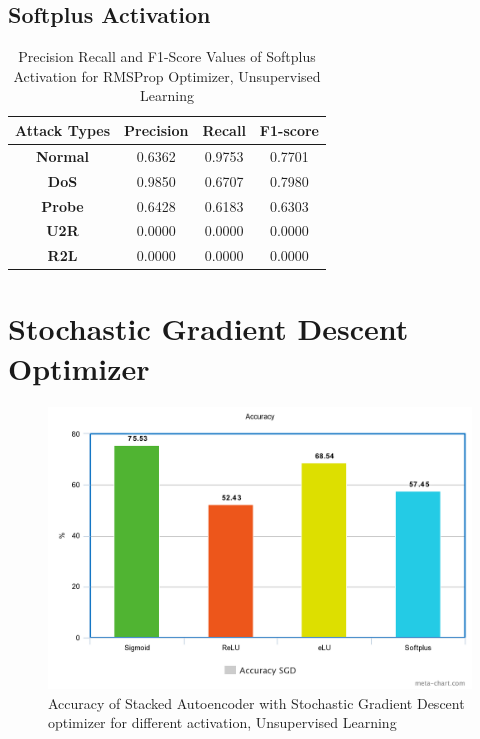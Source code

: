 \documentclass[12pt, a4paper]{report}
\begin{document}
\begin{appendices}
   \subsection{Softplus Activation}
  \begin{table}[h]
		\centering
		\captionsetup{justification=centering,margin=2cm}
		\begin{tabular}{|c|c|c|c|}
		\hline
		\textbf{Attack Types} & \textbf{Precision} & \textbf{Recall} & \textbf{F1-score} \\ \hline
		\textbf{Normal}       & 0.6362             & 0.9753          & 0.7701            \\ \hline
		\textbf{DoS}          & 0.9850             & 0.6707          & 0.7980            \\ \hline
		\textbf{Probe}        & 0.6428             & 0.6183          & 0.6303            \\ \hline
		\textbf{U2R}          & 0.0000             & 0.0000          & 0.0000            \\ \hline
		\textbf{R2L}          & 0.0000             & 0.0000          & 0.0000            \\ \hline
		\end{tabular}
		\caption{Precision Recall and F1-Score Values of Softplus Activation for RMSProp Optimizer, Unsupervised Learning}
		\label{classification softplus RMSProp tf}
		\end{table} 

 
\clearpage



\section{Stochastic Gradient Descent Optimizer}
  	\begin{figure}[ht]
	\centering
	\captionsetup{justification=centering,margin=2cm}
	\includegraphics[width=13cm]{SGD_accuracy_tensorflow.png}
	\caption{ Accuracy of Stacked Autoencoder with Stochastic Gradient Descent optimizer for different activation, Unsupervised Learning }
	\label{fig:acc_sgd_tf}
	\end{figure}
	

\end{appendices}
\end{document}
